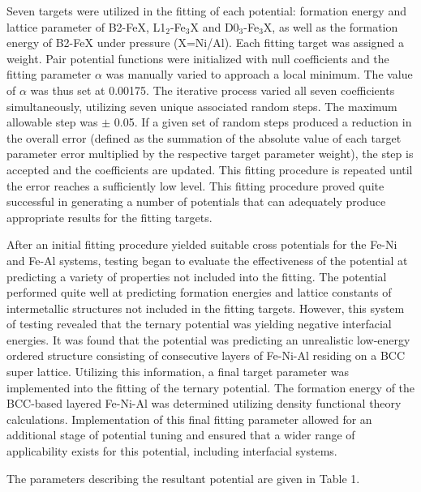 \documentclass[review]{elsarticle}
\begin{document}
Seven targets were utilized in the fitting of each potential:  formation energy and lattice parameter of B2-FeX, L1$_{2}$-Fe$_{3}$X and D0$_{3}$-Fe$_{3}$X, as well as the formation energy of B2-FeX under pressure (X=Ni/Al).  Each fitting target was assigned a weight.  Pair potential functions were initialized with null coefficients and the fitting parameter $\alpha$ was manually varied to approach a local minimum.  The value of $\alpha$ was thus set at 0.00175.  The iterative process varied all seven coefficients simultaneously, utilizing seven unique associated random steps.  The maximum allowable step was $\pm$ 0.05.  If a given set of random steps produced a reduction in the overall error (defined as the summation of the absolute value of each target parameter error multiplied by the respective target parameter weight), the step is accepted and the coefficients are updated.  This fitting procedure is repeated until the error reaches a sufficiently low level.  This fitting procedure proved quite successful in generating a number of potentials that can adequately produce appropriate results for the fitting targets.  

After an initial fitting procedure yielded suitable cross potentials for the Fe-Ni and Fe-Al systems, testing began to evaluate the effectiveness of the potential at predicting a variety of properties not included into the fitting.  The potential performed quite well at predicting formation energies and lattice constants of intermetallic structures not included in the fitting targets.  However, this system of testing revealed that the ternary potential was yielding negative interfacial energies.  It was found that the potential was predicting an unrealistic low-energy ordered structure consisting of consecutive layers of Fe-Ni-Al residing on a BCC super lattice.  Utilizing this information, a final target parameter was implemented into the fitting of the ternary potential.  The formation energy of the BCC-based layered Fe-Ni-Al was determined utilizing density functional theory calculations.  Implementation of this final fitting parameter allowed for an additional stage of potential tuning and ensured that a wider range of applicability exists for this potential, including interfacial systems.  

The parameters describing the resultant potential are given in Table 1. 
\end{document}
